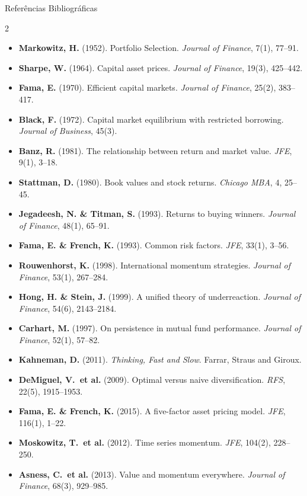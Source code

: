 \documentclass[aspectratio=169,12pt]{beamer}
\begin{document}
\begin{frame}[fragile]{Referências Bibliográficas}

\begin{multicols}{2}
\tiny
\begin{itemize}
  \item \textbf{Markowitz, H.} (1952). Portfolio Selection. \textit{Journal of Finance}, 7(1), 77--91.
  \item \textbf{Sharpe, W.} (1964). Capital asset prices. \textit{Journal of Finance}, 19(3), 425--442.
  \item \textbf{Fama, E.} (1970). Efficient capital markets. \textit{Journal of Finance}, 25(2), 383--417.
  \item \textbf{Black, F.} (1972). Capital market equilibrium with restricted borrowing. \textit{Journal of Business}, 45(3).
  \item \textbf{Banz, R.} (1981). The relationship between return and market value. \textit{JFE}, 9(1), 3--18.
  \item \textbf{Stattman, D.} (1980). Book values and stock returns. \textit{Chicago MBA}, 4, 25--45.
  \item \textbf{Jegadeesh, N. \& Titman, S.} (1993). Returns to buying winners. \textit{Journal of Finance}, 48(1), 65--91.
  \item \textbf{Fama, E. \& French, K.} (1993). Common risk factors. \textit{JFE}, 33(1), 3--56.
  \item \textbf{Rouwenhorst, K.} (1998). International momentum strategies. \textit{Journal of Finance}, 53(1), 267--284.
  \item \textbf{Hong, H. \& Stein, J.} (1999). A unified theory of underreaction. \textit{Journal of Finance}, 54(6), 2143--2184.
  \item \textbf{Carhart, M.} (1997). On persistence in mutual fund performance. \textit{Journal of Finance}, 52(1), 57--82.
  \item \textbf{Kahneman, D.} (2011). \textit{Thinking, Fast and Slow}. Farrar, Straus and Giroux.
  \item \textbf{DeMiguel, V.\ et al.} (2009). Optimal versus naive diversification. \textit{RFS}, 22(5), 1915--1953.
  \item \textbf{Fama, E. \& French, K.} (2015). A five-factor asset pricing model. \textit{JFE}, 116(1), 1--22.
  \item \textbf{Moskowitz, T.\ et al.} (2012). Time series momentum. \textit{JFE}, 104(2), 228--250.
  \item \textbf{Asness, C.\ et al.} (2013). Value and momentum everywhere. \textit{Journal of Finance}, 68(3), 929--985.

\end{itemize}
\end{multicols}
\end{frame}
\end{document}
